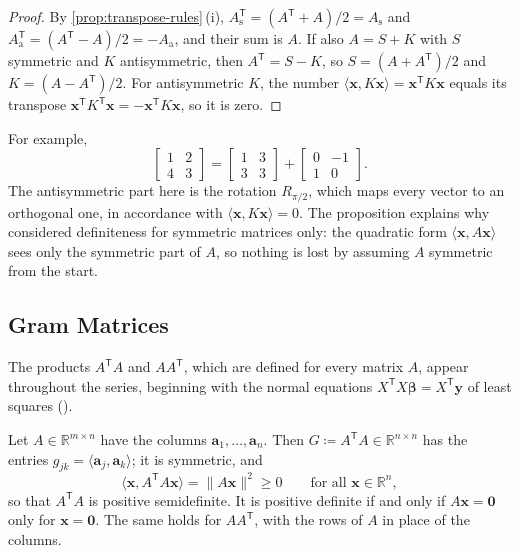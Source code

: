 \begin{proof}
By \cref{prop:transpose-rules}\,(i), $A_{\mathrm s}^{\mathsf T}=(A^{\mathsf T}+A)/2=A_{\mathrm s}$ and $A_{\mathrm a}^{\mathsf T}=(A^{\mathsf T}-A)/2=-A_{\mathrm a}$, and their sum is $A$. If also $A=S+K$ with $S$ symmetric and $K$ antisymmetric, then $A^{\mathsf T}=S-K$, so $S=(A+A^{\mathsf T})/2$ and $K=(A-A^{\mathsf T})/2$. For antisymmetric $K$, the number $\langle\mathbf x,K\mathbf x\rangle=\mathbf x^{\mathsf T}K\mathbf x$ equals its transpose $\mathbf x^{\mathsf T}K^{\mathsf T}\mathbf x=-\mathbf x^{\mathsf T}K\mathbf x$, so it is zero.
\end{proof}

For example,
\[
\begin{bmatrix}1&2\\4&3\end{bmatrix}=\begin{bmatrix}1&3\\3&3\end{bmatrix}+\begin{bmatrix}0&-1\\1&0\end{bmatrix}.
\]
The antisymmetric part here is the rotation $R_{\pi/2}$, which maps every vector to an orthogonal one, in accordance with $\langle\mathbf x,K\mathbf x\rangle=0$. The proposition explains why  considered definiteness for symmetric matrices only: the quadratic form $\langle\mathbf x,A\mathbf x\rangle$ sees only the symmetric part of $A$, so nothing is lost by assuming $A$ symmetric from the start.

\subsection{Gram Matrices}

The products $A^{\mathsf T}A$ and $AA^{\mathsf T}$, which are defined for every matrix $A$, appear throughout the series, beginning with the normal equations $X^{\mathsf T}X\boldsymbol\beta=X^{\mathsf T}\mathbf y$ of least squares ().

\begin{proposition}
\label{prop:gram}
Let $A\in\mathbb R^{m\times n}$ have the columns $\mathbf a_1,\ldots,\mathbf a_n$. Then $G\coloneqq A^{\mathsf T}A\in\mathbb R^{n\times n}$ has the entries $g_{jk}=\langle\mathbf a_j,\mathbf a_k\rangle$; it is symmetric, and
\[
\langle\mathbf x,A^{\mathsf T}A\mathbf x\rangle=\|A\mathbf x\|^2\ge0\qquad\text{for all }\mathbf x\in\mathbb R^n ,
\]
so that $A^{\mathsf T}A$ is positive semidefinite. It is positive definite if and only if $A\mathbf x=\mathbf 0$ only for $\mathbf x=\mathbf 0$. The same holds for $AA^{\mathsf T}$, with the rows of $A$ in place of the columns.
\end{proposition}

